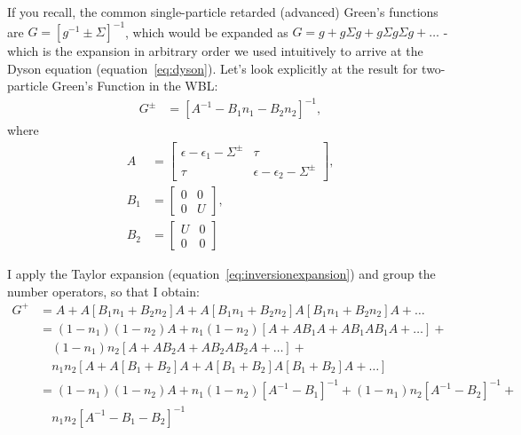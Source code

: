 If you recall, the common single-particle retarded (advanced) Green's functions are $G = \left[ g^{-1} \pm \Sigma \right]^{-1}$, which would be expanded as $G = g + g\Sigma g + g\Sigma g\Sigma g + \ldots$ - which is the expansion in arbitrary order we used intuitively to arrive at the Dyson equation (equation~\ref{eq:dyson}). Let's look explicitly at the result for two-particle Green's Function in the WBL:
\begin{align*}
G^\pm  &= \left[ A^{-1} - B_1 n_1 - B_2 n_2 \right]^{-1},
\end{align*}
where 
\begin{align*}
A &= \begin{bmatrix} \epsilon - \epsilon_1 - \Sigma^\pm & \tau \\ 
\tau & \epsilon - \epsilon_2 - \Sigma^\pm \end{bmatrix},\\
B_1 &= \begin{bmatrix} 0 & 0 \\ 0 & U \end{bmatrix},\\
B_2 &= \begin{bmatrix} U & 0 \\ 0 & 0 \end{bmatrix}
\end{align*}

I apply the Taylor expansion (equation~\ref{eq:inversionexpansion}) and group the number operators, so that I obtain:
\begin{align*}
G^+ &= A + A\left[B_1 n_1 + B_2 n_2\right]A + A\left[B_1 n_1 + B_2 n_2\right]  A\left[B_1 n_1 + B_2 n_2\right]  A + \ldots \\
&= (1-n_1)(1-n_2) A + n_1 (1-n_2)\left[A + AB_1 A + AB_1AB_1A + \ldots \right] + \\
&\quad (1-n_1)n_2 \left[ A + AB_2A + AB_2AB_2A + \ldots \right] +\\
&\quad n_1 n_2 \left[ A + A\left[B_1 + B_2\right]A+ A\left[B_1 + B_2\right]A\left[B_1 + B_2\right]A + \ldots\right] \\
&= (1-n_1)(1-n_2) A + n_1 (1-n_2) \left[ A^{-1} - B_1\right]^{-1} + (1-n_1) n_2 \left[ A^{-1} - B_2\right]^{-1} +\\&\quad n_1 n_2 \left[A^{-1} - B_1 - B_2 \right]^{-1}
\end{align*}

